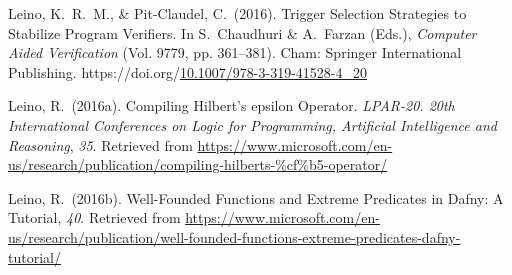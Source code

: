 \documentclass[12pt,twoside]{article}
\begin{document}
{\begin{thebibliography}{222}
\mdbibitemlabel{}Leino, K.~R.~M., \& Pit-Claudel, C.~(2016). Trigger Selection Strategies to Stabilize Program Verifiers. In S.~Chaudhuri \& A.~Farzan (Eds.), \emph{Computer Aided Verification} (Vol. 9779, pp. 361–381). Cham: Springer International Publishing. https://doi.org/\href{https://dx.doi.org/10.1007/978-3-319-41528-4_20}{10.1007/978-3-319-41528-4\_20}\label{chaudhuri_trigger_2016}%

\mdbibitemlabel{}Leino, R.~(2016a). Compiling Hilbert’s epsilon Operator. \emph{LPAR-20. 20th International Conferences on Logic for Programming, Artificial Intelligence and Reasoning}, \emph{35}. Retrieved from \href{https://www.microsoft.com/en-us/research/publication/compiling-hilberts-\%25cf\%25b5-operator/}{{\ttfamily https://\hspace{0pt}www.\hspace{0pt}microsoft.\hspace{0pt}com/\hspace{0pt}en-\hspace{0pt}us/\hspace{0pt}research/\hspace{0pt}publication/\hspace{0pt}compiling-\hspace{0pt}hilberts-\hspace{0pt}\hspace{0pt}\%cf\hspace{0pt}\%b5-\hspace{0pt}operator/\hspace{0pt}}}\label{leino_compiling_2016}%

\mdbibitemlabel{}Leino, R.~(2016b). Well-Founded Functions and Extreme Predicates in Dafny: A Tutorial, \emph{40}. Retrieved from \href{https://www.microsoft.com/en-us/research/publication/well-founded-functions-extreme-predicates-dafny-tutorial/}{{\ttfamily https://\hspace{0pt}www.\hspace{0pt}microsoft.\hspace{0pt}com/\hspace{0pt}en-\hspace{0pt}us/\hspace{0pt}research/\hspace{0pt}publication/\hspace{0pt}well-\hspace{0pt}founded-\hspace{0pt}functions-\hspace{0pt}extreme-\hspace{0pt}predicates-\hspace{0pt}dafny-\hspace{0pt}tutorial/\hspace{0pt}}}\label{leino_well-founded_2016}%


\end{thebibliography}}
\end{document}
